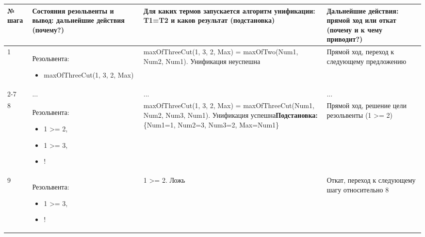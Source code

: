 \documentclass[14pt,a4paper]{scrreprt}
\begin{document}
\begin{table}[H]
	\begin{tabular}{|p{0.8cm\small}|p{4.7cm\small}|p{5.7cm\small}|p{4cm\small}|}	
		\hline
		№ шага & Состояния резольвенты и вывод: дальнейшие действия (почему?) & Для каких термов запускается алгоритм унификации: T1=T2 и каков результат (подстановка) & Дальнейшие действия: прямой ход или откат (почему и к чему приводит?)\\
		\hline
		1 & Резольвента:\begin{itemize}\item maxOfThreeCut(1, 3, 2, Max) \end{itemize} & maxOfThreeCut(1, 3, 2, Max) = maxOfTwo(Num1, Num2, Num1). Унификация неуспешна & Прямой ход, переход к следующему предложению \\
		\hline
		2-7 & ... & ... & ...\\
		\hline
		8 & Резольвента:\begin{itemize}\item 1 >= 2, \item 1 >= 3, \item ! \end{itemize} & maxOfThreeCut(1, 3, 2, Max) = maxOfThreeCut(Num1, Num2, Num3, Num1). Унификация успешна\linebreak \textbf{Подстановка:} \{Num1=1, Num2=3, Num3=2, Max=Num1\}& Прямой ход, решение цели резольвенты (1 >= 2)\\
		\hline
		9 & Резольвента:\begin{itemize}\item 1 >= 3, \item ! \end{itemize} & 1 >= 2. Ложь & Откат, переход к следующему шагу относительно 8\\
		\hline
	\end{tabular}
\end{table}
\end{document}
